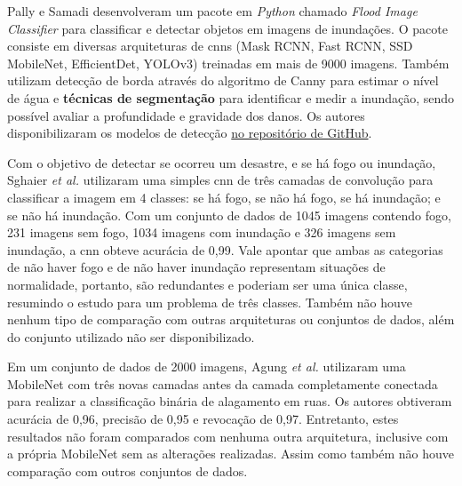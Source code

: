 Pally e Samadi\cite{PALLY2022105285} desenvolveram um pacote em \textit{Python} chamado \textit{Flood Image Classifier} para classificar e detectar objetos em imagens de inundações. 
O pacote consiste em diversas arquiteturas de \acrshort{cnn}s (Mask RCNN, Fast RCNN, SSD MobileNet, EfficientDet, YOLOv3) treinadas em mais de 9000 imagens. 
Também utilizam detecção de borda através do algoritmo de Canny\cite{canny1986} para estimar o nível de água e \textbf{técnicas de segmentação} para identificar e medir a inundação, 
sendo possível avaliar a profundidade e gravidade dos danos.
Os autores disponibilizaram os modelos de detecção \href{https://github.com/Clemson-Hydroinformatics-Lab/FloodImageClassifier}{no repositório de GitHub}.

Com o objetivo de detectar se ocorreu um desastre, e se há fogo ou inundação, Sghaier \textit{et al.}\cite{sghaier2023} utilizaram uma simples \acrshort{cnn} de três camadas de convolução para classificar a imagem em 4 classes: 
se há fogo, se não há fogo, se há inundação; e se não há inundação. 
Com um conjunto de dados de 1045 imagens contendo fogo, 231 imagens sem fogo, 1034 imagens com inundação e 326 imagens sem inundação, a \acrshort{cnn} obteve acurácia de 0,99. 
Vale apontar que ambas as categorias de não haver fogo e de não haver inundação representam situações de normalidade, portanto, são redundantes e poderiam ser uma única classe, 
resumindo o estudo para um problema de três classes.
Também não houve nenhum tipo de comparação com outras arquiteturas ou conjuntos de dados, além do conjunto utilizado não ser disponibilizado.

Em um conjunto de dados de 2000 imagens, Agung \textit{et al.}\cite{agung2023} utilizaram uma MobileNet com três novas camadas antes da camada completamente conectada para realizar a classificação binária de alagamento em ruas. 
Os autores obtiveram acurácia de 0,96, precisão de 0,95 e revocação de 0,97. 
Entretanto, estes resultados não foram comparados com nenhuma outra arquitetura, inclusive com a própria MobileNet sem as alterações realizadas. 
Assim como também não houve comparação com outros conjuntos de dados.


